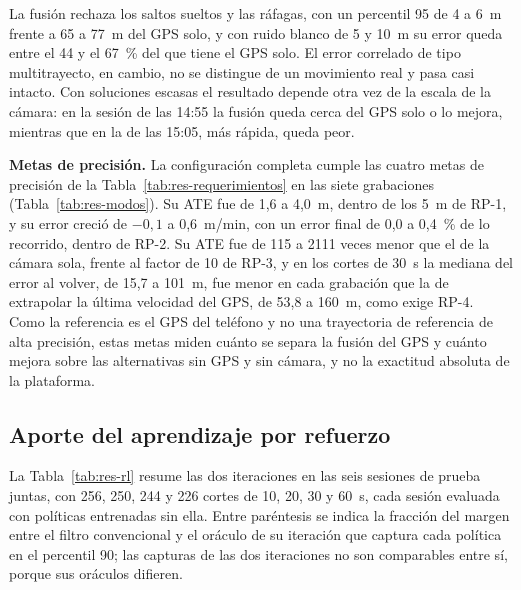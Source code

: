 La fusión rechaza los saltos sueltos y las ráfagas, con un percentil 95 de 4 a 6~m frente a 65 a 77~m del GPS solo, y con ruido blanco de 5 y 10~m su error queda entre el 44 y el 67~\% del que tiene el GPS solo.
El error correlado de tipo multitrayecto, en cambio, no se distingue de un movimiento real y pasa casi intacto.
Con soluciones escasas el resultado depende otra vez de la escala de la cámara: en la sesión de las 14:55 la fusión queda cerca del GPS solo o lo mejora, mientras que en la de las 15:05, más rápida, queda peor.

\textbf{Metas de precisión.}
La configuración completa cumple las cuatro metas de precisión de la Tabla~\ref{tab:res-requerimientos} en las siete grabaciones (Tabla~\ref{tab:res-modos}).
Su ATE fue de 1,6 a 4,0~m, dentro de los 5~m de RP-1, y su error creció de $-0{,}1$ a 0,6~m/min, con un error final de 0,0 a 0,4~\% de lo recorrido, dentro de RP-2.
Su ATE fue de 115 a 2111 veces menor que el de la cámara sola, frente al factor de 10 de RP-3, y en los cortes de 30~s la mediana del error al volver, de 15,7 a 101~m, fue menor en cada grabación que la de extrapolar la última velocidad del GPS, de 53,8 a 160~m, como exige RP-4.
Como la referencia es el GPS del teléfono y no una trayectoria de referencia de alta precisión, estas metas miden cuánto se separa la fusión del GPS y cuánto mejora sobre las alternativas sin GPS y sin cámara, y no la exactitud absoluta de la plataforma.

\subsection{Aporte del aprendizaje por refuerzo}
\label{sec:res-aporte-rl}

La Tabla~\ref{tab:res-rl} resume las dos iteraciones en las seis sesiones de prueba juntas, con 256, 250, 244 y 226 cortes de 10, 20, 30 y 60~s, cada sesión evaluada con políticas entrenadas sin ella.
Entre paréntesis se indica la fracción del margen entre el filtro convencional y el oráculo de su iteración que captura cada política en el percentil 90; las capturas de las dos iteraciones no son comparables entre sí, porque sus oráculos difieren.

